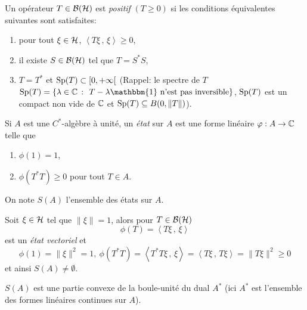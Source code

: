 \begin{defi}
  Un opérateur $T \in \mathcal{B}(\mathcal{H})$ est \emph{positif} $(T \geq 0)$ si les conditions équivalentes
  suivantes sont satisfaites:
  \begin{enumerate}
  \item pour tout $\xi \in \mathcal{H}$, $\left \langle T\xi\, ,\, \xi \right \rangle \geq 0$,
  \item il existe $S \in \mathcal{B}(\mathcal{H})$ tel que $T = S^\ast S$,
  \item $T = T^\ast$ et $\operatorname{Sp}(T) \subset [0, + \infty[$ (Rappel: le spectre de $T$ $\Sp(T) = \{\lambda
      \in \C\ \colon \ T - \lambda \mathbbm{1} \text{ n'est pas inversible}\}$, $\operatorname{Sp}(T)$ est un compact non
      vide de $\mathbb{C}$ et $\operatorname{Sp}(T) \subseteq B(0, \|T\|)$).
  \end{enumerate}
\end{defi}


\begin{defi}
  Si $A$ est une $C^\ast$-algèbre à unité, un \emph{état} sur $A$ est une forme linéaire $\varphi: A
  \to \mathbb{C}$ telle que
  \begin{enumerate}
  \item $\phi(1) = 1$,
  \item $\phi(T^\ast T) \geq 0$ pour tout $T \in A$.
  \end{enumerate}
  On note $S(A)$ l'ensemble des états sur $A$.
\end{defi}


\begin{ex}
  Soit $\xi \in \mathcal{H}$ tel que $\|\xi\| = 1$, alors pour $T \in \mathcal{B}(\mathcal{H})$
  \[ \phi(T) = \left \langle T\xi\, ,\, \xi \right \rangle \]
  est un \emph{état vectoriel} et 
  \[ \phi(1) = \|\xi\|^2 = 1,\ \phi(T^\ast T) = \left \langle T^\ast T \xi\, ,\, \xi \right \rangle  = \left
      \langle T \xi\, ,\, T \xi \right \rangle  = \|T \xi\|^2 \geq 0 \]
  et ainsi $S(A) \neq \emptyset$.
\end{ex}

\begin{prop}
  $S(A)$ est une partie convexe de la boule-unité du dual $A^\ast$ (ici $A^\ast$ est l'ensemble des formes
  linéaires continues sur $A$).
\end{prop}

